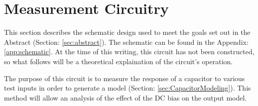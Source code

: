 \section {Measurement Circuitry}
\label{sec:measCirc}
This section describes the schematic design used to meet the goals set out in the Abstract (Section: \ref{sec:abstract}). The schematic can be found in the Appendix: \ref{app:schematic}. At the time of this writing, this circuit has not been constructed, so what follows will be a theoretical explaination of the circuit's operation.

The purpose of this circuit is to measure the response of a capacitor to various test inputs in order to generate a model (Section: \ref{sec:CapacitorModeling}). This method will allow an analysis of the effect of the DC bias on the output model.

\nocite{my_ieeePaper}













